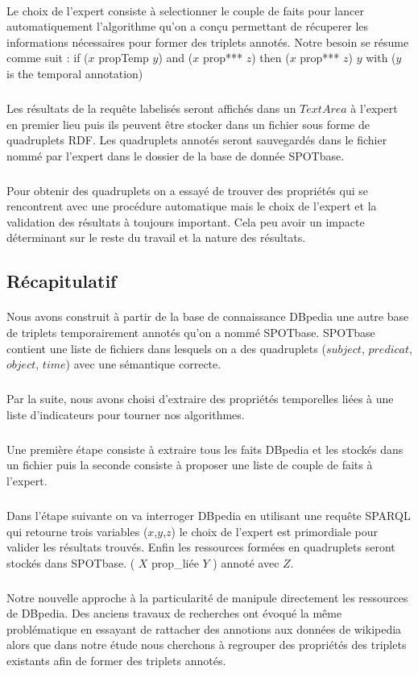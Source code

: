 \paragraph{}
Le choix de l'expert consiste à selectionner le couple de faits pour lancer automatiquement l'algorithme qu'on a conçu permettant de récuperer les informations nécessaires pour former des triplets annotés.
\newline
Notre besoin se résume comme suit :
\newline
if ($x$ propTemp $y$) and ($x$ prop*** $z$) then
\newline
($x$ prop*** $z$) $y$ with ($y$ is the temporal annotation)
\subparagraph{}
Les résultats de la requête labelisés seront affichés dans un $TextArea$ à l'expert en premier lieu puis ils peuvent être stocker dans un fichier sous forme de quadruplets RDF.
Les quadruplets annotés seront sauvegardés dans le fichier nommé par l'expert dans le dossier de la base de donnée SPOTbase.
\subparagraph{}
Pour obtenir des quadruplets on a essayé de trouver des propriétés qui se rencontrent avec une procédure automatique mais le choix de l’expert et la validation des résultats à toujours important. Cela peu avoir un impacte déterminant sur le reste du travail et la nature des résultats.
\subsection*{Récapitulatif}
\paragraph{}
Nous avons construit à partir de la base de connaissance DBpedia une autre base de  triplets temporairement annotés qu’on a nommé SPOTbase.
SPOTbase contient une liste de fichiers dans lesquels on a des quadruplets ($subject$, $predicat$, $object$, $time$) avec une sémantique correcte. 
\subparagraph{}
Par la suite, nous avons choisi d’extraire des propriétés temporelles liées à une liste d'indicateurs pour tourner nos algorithmes.
\subparagraph{}
Une première étape consiste à extraire tous les faits DBpedia et les stockés dans un fichier puis la seconde consiste à proposer une liste de couple de faits à l’expert.
\subparagraph{}
Dans l’étape suivante on va interroger DBpedia en utilisant une requête SPARQL qui retourne trois variables ($x$,$y$,$z$) le choix de l’expert est primordiale pour valider les résultats trouvés.
Enfin les ressources formées en quadruplets seront stockés dans SPOTbase.   
\newline
( $X$ prop\_liée $Y$ ) annoté avec $Z$.
\subparagraph{}
Notre nouvelle approche à la particularité de manipule directement les ressources de DBpedia.
Des anciens travaux de recherches ont évoqué la même problématique en essayant de rattacher des annotions aux données de wikipedia alors que dans notre étude nous cherchons à regrouper des propriétés des triplets existants afin de former des triplets annotés.





		


 
